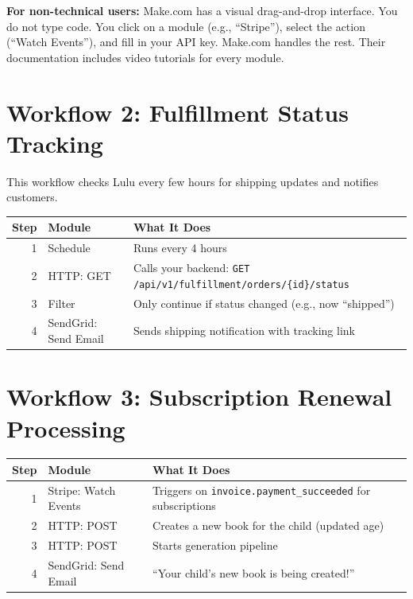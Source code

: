 \documentclass[12pt, letterpaper, oneside]{book}
\begin{document}
\begin{infobox}
\textbf{For non-technical users:} Make.com has a visual drag-and-drop interface. You do not type code. You click on a module (e.g., ``Stripe''), select the action (``Watch Events''), and fill in your API key. Make.com handles the rest. Their documentation includes video tutorials for every module.
\end{infobox}

\section{Workflow 2: Fulfillment Status Tracking}

This workflow checks Lulu every few hours for shipping updates and notifies customers.

\begin{table}[H]
\centering
\small
\begin{tabularx}{\textwidth}{rlX}
\toprule
\textbf{Step} & \textbf{Module} & \textbf{What It Does} \\
\midrule
1 & Schedule & Runs every 4 hours \\
2 & HTTP: GET & Calls your backend: \texttt{GET /api/v1/fulfillment/orders/\{id\}/status} \\
3 & Filter & Only continue if status changed (e.g., now ``shipped'') \\
4 & SendGrid: Send Email & Sends shipping notification with tracking link \\
\bottomrule
\end{tabularx}
\end{table}

\section{Workflow 3: Subscription Renewal Processing}

\begin{table}[H]
\centering
\small
\begin{tabularx}{\textwidth}{rlX}
\toprule
\textbf{Step} & \textbf{Module} & \textbf{What It Does} \\
\midrule
1 & Stripe: Watch Events & Triggers on \texttt{invoice.payment\_succeeded} for subscriptions \\
2 & HTTP: POST & Creates a new book for the child (updated age) \\
3 & HTTP: POST & Starts generation pipeline \\
4 & SendGrid: Send Email & ``Your child's new book is being created!'' \\
\bottomrule
\end{tabularx}
\end{table}
\end{document}
